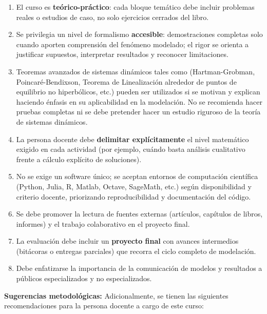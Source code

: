 \begin{refsection}
\begin{enumerate}
    \item El curso es \textbf{teórico-práctico}: cada bloque temático debe incluir problemas reales o estudios de caso, no solo ejercicios cerrados del libro.
    \item Se privilegia un nivel de formalismo \textbf{accesible}: demostraciones completas solo cuando aporten comprensión del fenómeno modelado; el rigor se orienta a justificar supuestos, interpretar resultados y reconocer limitaciones.
    \item Teoremas avanzados de sistemas dinámicos tales como (Hartman-Grobman, Poincaré-Bendixson, Teorema de Linealización alrededor de puntos de equilibrio no hiperbólicos, etc.) pueden ser utilizados si se motivan y explican haciendo énfasis en su aplicabilidad en la modelación. No se recomienda hacer pruebas completas ni se debe pretender hacer un estudio riguroso de la teoría de sistemas dinámicos.
    \item La persona docente debe \textbf{delimitar explícitamente} el nivel matemático exigido en cada actividad (por ejemplo, cuándo basta análisis cualitativo frente a cálculo explícito de soluciones).
    \item No se exige un software único; se aceptan entornos de computación científica (Python, Julia, R, Matlab, Octave, SageMath, etc.) según disponibilidad y criterio docente, priorizando reproducibilidad y documentación del código.
    \item Se debe promover la lectura de fuentes externas (artículos, capítulos de libros, informes) y el trabajo colaborativo en el proyecto final.
    \item La evaluación debe incluir un \textbf{proyecto final} con avances intermedios (bitácoras o entregas parciales) que recorra el ciclo completo de modelación.
    \item Debe enfatizarse la importancia de la comunicación de modelos y resultados a públicos especializados y no especializados.
\end{enumerate}

\textbf{Sugerencias metodológicas:} Adicionalmente, se tienen las siguientes recomendaciones para la persona docente a cargo de este curso:


\end{refsection}
